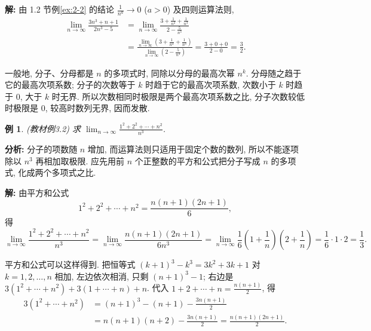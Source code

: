 \documentclass[UTF8,openany]{ctexbook}
\theoremstyle{chinesetextbook}
\newtheorem{example}{例}[section]
\newenvironment{cnsolution}{\par\indent\textbf{解:} \ignorespaces}{\par}
\begin{document}
\begin{cnsolution}
由 1.2 节例\ref{ex:2-2} 的结论 $\displaystyle\frac1{n^a}\to0$ ($a>0$) 及四则运算法则,
\[
\begin{aligned}
\lim_{n\to\infty}\frac{3n^3+n+1}{2n^3-5}
&=\lim_{n\to\infty}\frac{3+\frac1{n^2}+\frac1{n^3}}{2-\frac5{n^3}}\\
&=\frac{\displaystyle\lim_{n\to\infty}\left(3+\frac1{n^2}+\frac1{n^3}\right)}{\displaystyle\lim_{n\to\infty}\left(2-\frac5{n^3}\right)}
=\frac{3+0+0}{2-0}=\frac32.
\end{aligned}
\]
\end{cnsolution}
一般地, 分子、分母都是 $n$ 的多项式时, 同除以分母的最高次幂 $n^k$. 分母随之趋于它的最高次项系数; 分子的次数等于 $k$ 时趋于它的最高次项系数, 次数小于 $k$ 时趋于 $0$, 大于 $k$ 时无界. 所以次数相同时极限是两个最高次项系数之比, 分子次数较低时极限是 $0$, 较高时数列无界, 因而发散.
\begin{example}
\textnormal{(教材例3.2)} 求 $\displaystyle\lim_{n\to\infty}\frac{1^2+2^2+\cdots+n^2}{n^3}$.
\end{example}
\par\indent\textbf{分析:} 分子的项数随 $n$ 增加, 而运算法则只适用于固定个数的数列, 所以不能逐项除以 $n^3$ 再相加取极限. 应先用前 $n$ 个正整数的平方和公式把分子写成 $n$ 的多项式, 化成两个多项式之比.
\begin{cnsolution}
由平方和公式
\[
1^2+2^2+\cdots+n^2=\frac{n(n+1)(2n+1)}6,
\]
得
\[
\lim_{n\to\infty}\frac{1^2+2^2+\cdots+n^2}{n^3}
=\lim_{n\to\infty}\frac{n(n+1)(2n+1)}{6n^3}
=\lim_{n\to\infty}\frac16\left(1+\frac1n\right)\left(2+\frac1n\right)
=\frac16\cdot1\cdot2=\frac13.
\]
\end{cnsolution}
平方和公式可以这样得到. 把恒等式 $(k+1)^3-k^3=3k^2+3k+1$ 对 $k=1,2,\ldots,n$ 相加, 左边依次相消, 只剩 $(n+1)^3-1$; 右边是 $3(1^2+\cdots+n^2)+3(1+\cdots+n)+n$. 代入 $\displaystyle1+2+\cdots+n=\frac{n(n+1)}2$, 得
\[
\begin{aligned}
3(1^2+\cdots+n^2)&=(n+1)^3-(n+1)-\frac{3n(n+1)}2\\
&=n(n+1)(n+2)-\frac{3n(n+1)}2=\frac{n(n+1)(2n+1)}2.
\end{aligned}
\]
\end{document}
